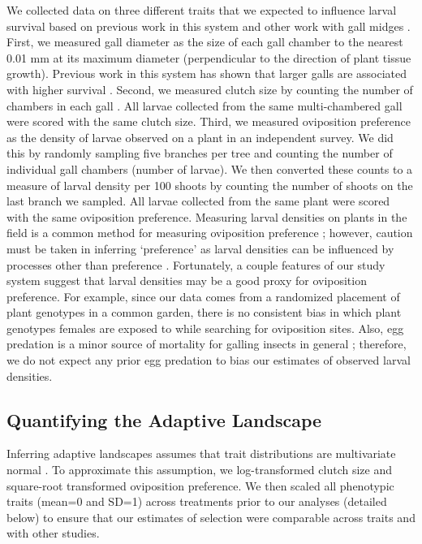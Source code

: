 \documentclass[11pt,]{article}
\begin{document}
We collected data on three different traits that we expected to
influence larval survival based on previous work in this system
\citep{Barbour2016} and other work with gall midges
\citep{Weis1983, Heath2018}. First, we measured gall diameter as the
size of each gall chamber to the nearest 0.01 mm at its maximum diameter
(perpendicular to the direction of plant tissue growth). Previous work
in this system has shown that larger galls are associated with higher
survival \citep{Barbour2016}. Second, we measured clutch size by
counting the number of chambers in each gall
\citep{Weis1983, Heath2018}. All larvae collected from the same
multi-chambered gall were scored with the same clutch size. Third, we
measured oviposition preference as the density of larvae observed on a
plant in an independent survey. We did this by randomly sampling five
branches per tree and counting the number of individual gall chambers
(number of larvae). We then converted these counts to a measure of
larval density per 100 shoots by counting the number of shoots on the
last branch we sampled. All larvae collected from the same plant were
scored with the same oviposition preference. Measuring larval densities
on plants in the field is a common method for measuring oviposition
preference \citep{Gripenberg2010}; however, caution must be taken in
inferring `preference' as larval densities can be influenced by
processes other than preference \citep{Singer1986}. Fortunately, a
couple features of our study system suggest that larval densities may be
a good proxy for oviposition preference. For example, since our data
comes from a randomized placement of plant genotypes in a common garden,
there is no consistent bias in which plant genotypes females are exposed
to while searching for oviposition sites. Also, egg predation is a minor
source of mortality for galling insects in general \citep{Hawkins1997};
therefore, we do not expect any prior egg predation to bias our
estimates of observed larval densities.

\subsection{Quantifying the Adaptive
Landscape}\label{quantifying-the-adaptive-landscape}

Inferring adaptive landscapes assumes that trait distributions are
multivariate normal \citep{Lande1983}. To approximate this assumption,
we log-transformed clutch size and square-root transformed oviposition
preference. We then scaled all phenotypic traits (mean=0 and SD=1)
across treatments prior to our analyses (detailed below) to ensure that
our estimates of selection were comparable across traits and with other
studies.
\end{document}
